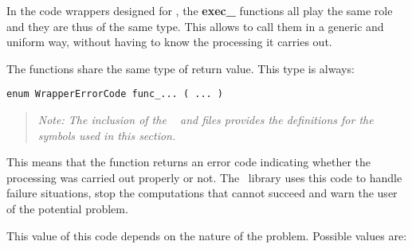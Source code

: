In the code wrappers designed for \OT , the {\bf exec\_} functions all play the same role and they are thus of the same type. This allows to call them in a generic and uniform way, without having to know the processing it carries out.

The functions share the same type of return value. This type is always:

\lstset{language=C++, basicstyle=\normalsize}
\begin{lstlisting}[frame=TBRL]
enum WrapperErrorCode func_... ( ... )
\end{lstlisting}

\small
\begin{quote}
\textit{Note: The inclusion of the \OT\  and  files provides the definitions for the symbols used in this section.}
\end{quote}
\normalsize

This means that the function returns an error code indicating whether the processing was carried out properly or not. The \OT\ library uses this code to handle failure situations, stop the computations that cannot succeed and warn the user of the potential problem.

This value of this code depends on the nature of the problem. Possible values are:

